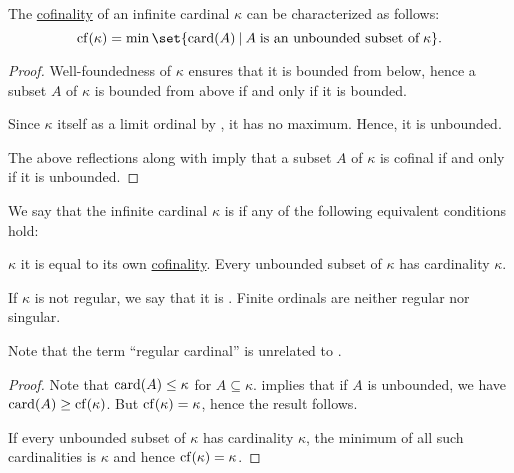 \begin{proposition}\label{thm:cardinal_cofinality}
  The \hyperref[def:cofinality]{cofinality} of an infinite cardinal \( \kappa \) can be characterized as follows:
  \begin{equation*}
    \op{cf}(\kappa) = \min\set{ \card(A) \given A \T{is an unbounded subset of} \kappa }.
  \end{equation*}
\end{proposition}
\begin{proof}
  Well-foundedness of \( \kappa \) ensures that it is bounded from below, hence a subset \( A \) of \( \kappa \) is bounded from above if and only if it is bounded.

  Since \( \kappa \) itself as a limit ordinal by , it has no maximum. Hence, it is unbounded.

  The above reflections along with  imply that a subset \( A \) of \( \kappa \) is cofinal if and only if it is unbounded.
\end{proof}

\begin{definition}\label{def:regular_cardinal}
  We say that the infinite cardinal \( \kappa \) is  if any of the following equivalent conditions hold:
  \begin{thmenum}
     \( \kappa \) it is equal to its own \hyperref[def:cofinality]{cofinality}.
     Every unbounded subset of \( \kappa \) has cardinality \( \kappa \).
  \end{thmenum}

  If \( \kappa \) is not regular, we say that it is . Finite ordinals are neither regular nor singular.
\end{definition}
\begin{comments}
  \item Note that the term \enquote{regular cardinal} is unrelated to .
\end{comments}
\begin{proof}
   Note that \( \operatorname{card}(A) \leq \kappa \) for \( A \subseteq \kappa \).  implies that if \( A \) is unbounded, we have \( \card(A) \geq \op{cf}(\kappa) \). But \( \op{cf}(\kappa) = \kappa \), hence the result follows.

   If every unbounded subset of \( \kappa \) has cardinality \( \kappa \), the minimum of all such cardinalities is \( \kappa \) and hence \( \op{cf}(\kappa) = \kappa \).
\end{proof}

